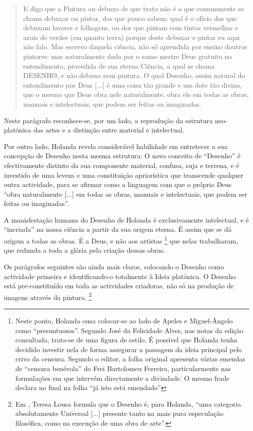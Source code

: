 \documentclass{article}
\begin{document}
\begin{quote}
  E digo que a Pintura ou debuxo de que trato não é o que comummente
  se chama debuxar ou pintar, dos que pouco sabem; qual é o ofício dos
  que debuxam lavores e folhagens, ou dos que pintam com tintas
  vermelhas e azuis de verdes (em quanto terra) porque deste debuxar e
  pintar eu aqui não falo. Mas escrevo daquela ciência, não só
  aprendida por ensino doutros pintores: mas naturalmente dada por o
  sumo mestre Deus gratuita no entendimento, procedida de sua eterna
  Ciência, a qual se chama DESENHO, e não debuxo nem pintura. O qual
  Desenho, assim natural do entendimento por Deus [...] é uma coisa
  tão grande e um dote tão divino, que o mesmo que Deus obra nele
  naturalmente, obra ele em todas as obras, manuais e intelectuais,
  que podem ser feitas ou imaginadas.
\end{quote}

Neste parágrafo reconhece-se, por um lado, a reprodução da estrutura
neo-platónica das artes e a distinção entre material e intelectual.

Por outro lado, Holanda revela considerável habilidade em entretecer a
sua concepção de Desenho nesta mesma estrutura: O novo conceito de
``Desenho'' é efectivamente distinto da sua componente material,
confusa, suja e terrena, e é investido de uma leveza e uma
constituição apriorística que transcende qualquer outra actividade,
para se afirmar como a linguagem com que o próprio Deus ``obra
naturalmente [...] em todas as obras, manuais e intelectuais, que
podem ser feitas ou imaginadas''.

A manisfestação humana do Desenho de Holanda é exclusivamente
intelectual, e é ``incriada'' na nossa ciência a partir da sua origem
eterna. É assim que se dá origem a todas as obras. É a Deus, e não aos
artistas \footnote{Neste ponto, Holanda ousa colocar-se ao lado de
  Apeles e Miguel-Ângelo como ``presuntuosos''. Segundo José da
  Felicidade Alves, nas notas da edição consultada, trata-se de uma
  figura de estilo. É possível que Holanda tenha decidido investir
  nela de forma assegurar a passagem da ideia principal pelo crivo da
  censura. Segundo o editor, a folha original apresenta várias emendas
  de ``censura benévola'' do Frei Bartolomeu Ferreira, particularmente
  nas formulações em que intervém directamente a divindade. O mesmo
  frade declara no final na folha ``já isto está emendado''} que nelas
trabalharam, que redunda a toda a glória pela criação dessas obras.

Os parágrafos seguintes são ainda mais claros, colocando o Desenho
como actividade primeira e identificando-o totalmente à Ideia
platónica. O Desenho está pre-constituído em toda as actividades
criadoras, não só na produção de imagens através da
pintura. \footnote{Em \cite{teresa}, Teresa Lousa formula que o
  Desenho é, para Holanda, ``uma categoria absolutamente Universal
  [...] presente tanto na mais pura especulação filosófica, como na
  execução de uma obra de arte''.}
\end{document}
